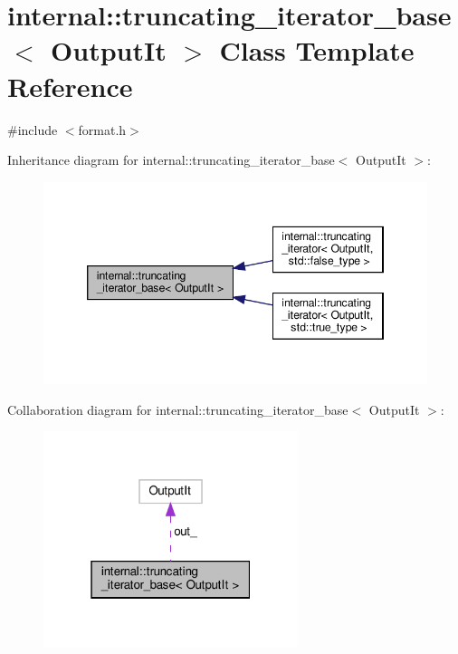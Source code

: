 \hypertarget{classinternal_1_1truncating__iterator__base}{}\section{internal\+:\+:truncating\+\_\+iterator\+\_\+base$<$ Output\+It $>$ Class Template Reference}
\label{classinternal_1_1truncating__iterator__base}


{\ttfamily \#include $<$format.\+h$>$}



Inheritance diagram for internal\+:\+:truncating\+\_\+iterator\+\_\+base$<$ Output\+It $>$\+:
\nopagebreak
\begin{figure}[H]
\begin{center}
\leavevmode
\includegraphics[width=346pt]{classinternal_1_1truncating__iterator__base__inherit__graph}
\end{center}
\end{figure}


Collaboration diagram for internal\+:\+:truncating\+\_\+iterator\+\_\+base$<$ Output\+It $>$\+:
\nopagebreak
\begin{figure}[H]
\begin{center}
\leavevmode
\includegraphics[width=211pt]{classinternal_1_1truncating__iterator__base__coll__graph}
\end{center}
\end{figure}
